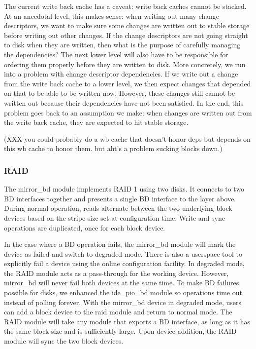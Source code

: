 The current write back cache has a caveat: write back caches cannot be
stacked. At an anecdotal level, this makes sense: when writing out
many change descriptors, we want to make sure some changes are written
out to stable storage before writing out other changes. If the change
descriptors are not going straight to disk when they are written, then
what is the purpose of carefully managing the dependencies? The next
lower level will also have to be responsible for ordering them
properly before they are written to disk. More concretely, we run into
a problem with change descriptor dependencies. If we write out a
change from the write back cache to a lower level, we then expect
changes that depended on that to be able to be written now. However,
these changes still cannot be written out because their dependencies
have not been satisfied. In the end, this problem goes back to an
assumption we make: when changes are written out from the write back
cache, they are expected to hit stable storage.

(XXX you could probably do a wb cache that doesn't honor deps but
depends on this wb cache to honor them. but aht's a problem sucking
blocks down.)

\subsubsection{RAID}
\label{sec:solution:impl:raid}

The mirror\_bd module implements RAID 1 using two disks. It connects to two
BD interfaces together and presents a single BD interface to the layer above.
During normal operation, reads alternate between the two underlying block
devices based on the stripe size set at configuration time. Write and sync
operations are duplicated, once for each block device.

In the case where a BD operation fails, the mirror\_bd module will mark the
device as failed and switch to degraded mode. There is also a userspace tool to
explicitly fail a device using the online configuration facility. In degraded
mode, the RAID module acts as a pass-through for the working device. However,
mirror\_bd will never fail both devices at the same time. To make BD failures
possible for disks, we enhanced the ide\_pio\_bd module so operations time out
instead of polling forever. With the mirror\_bd device in degraded mode, users
can add a block device to the raid module and return to normal mode. The RAID
module will take any module that exports a BD interface, as long as it has the
same block size and is sufficiently large. Upon device addition, the RAID module
will sync the two block devices.

